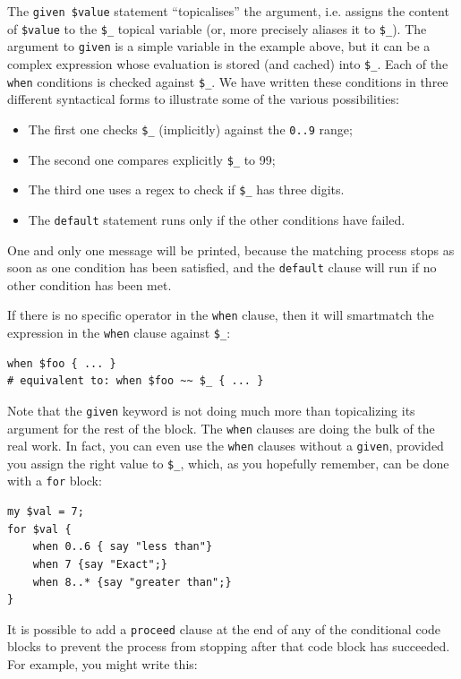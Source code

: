 The \verb'given $value' statement ``topicalises'' the argument, 
i.e. assigns the content of  \verb'$value' to the \verb'$_' 
topical variable (or, more precisely aliases it to \verb'$_'). 
The argument to {\tt given} is a simple variable in the 
example above, but it can be a complex expression whose 
evaluation is stored (and cached) into \verb'$_'. 
Each of the {\tt when} conditions is checked against \verb'$_'. 
We have written these conditions in three different syntactical 
forms to illustrate some of the various possibilities:
\begin{itemize}
\item The first one checks \verb'$_' (implicitly) against 
the \verb'0..9' range;
\item The second one compares explicitly \verb'$_' to 99;
\item The third one uses a regex to check if \verb'$_' has 
three digits.
\item The \verb'default' statement runs only if the other 
conditions have failed.
\end{itemize}

One and only one message will be printed, because the 
matching process stops as soon as one condition has been 
satisfied, and the \verb'default' clause will run if 
no other condition has been met.

If there is no specific operator in the {\tt when} clause, 
then it will smartmatch the expression in the {\tt when} 
clause against \verb'$_':

\begin{verbatim}
when $foo { ... }
# equivalent to: when $foo ~~ $_ { ... }
\end{verbatim}

Note that the {\tt given} keyword is not doing much more than 
topicalizing its argument for the rest of the block. 
The {\tt when} clauses are doing the bulk of the real work. In fact, 
you can even use the {\tt when} clauses without a {\tt given}, 
provided you assign the right value to \verb'$_', which, as you 
hopefully remember, can be done with a {\tt for} block:

\begin{verbatim}
my $val = 7;
for $val { 
    when 0..6 { say "less than"}
    when 7 {say "Exact";} 
    when 8..* {say "greater than";}
}
\end{verbatim}

It is possible to add a {\tt proceed} clause at the end of 
any of the conditional code blocks to prevent the process 
from stopping after that code block has succeeded. For example, 
you might write this:

